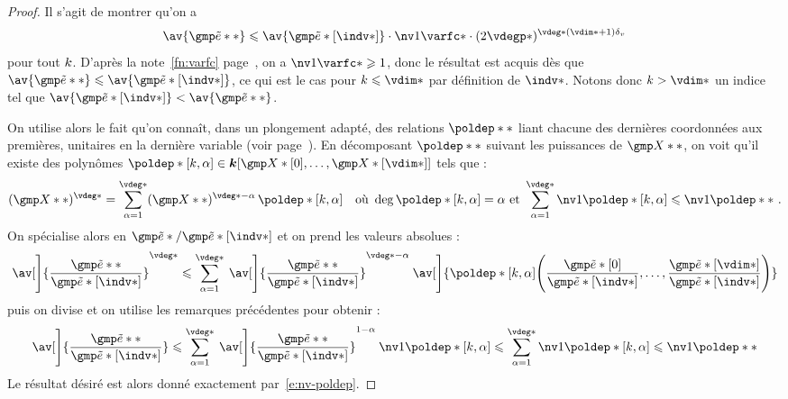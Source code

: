 \begin{proof}
  Il s'agit de montrer qu'on a
  \begin{equation}
    \av{ \cexa** }
    \le
    \av{ \cexa*[\indv*] }
    \cdot \nv1{ \varfc* }
    \cdot ( 2 \vdegp* )^{\vdeg* (\vdim* + 1) \dv}
  \end{equation}
  pour tout \( k \). D'après la note~\ref{fn:varfc}
  page~\pageref{fn:varfc}, on a \( \nv1{ \varfc* } \ge 1 \), donc le résultat
  est acquis dès que \( \av{ \cexa** } \le \av{ \cexa*[\indv*] } \), ce qui est
  le cas pour \( \ind \le \vdim* \) par définition de \( \indv* \). Notons donc
  \( \ind > \vdim* \) un indice tel que \( \av{ \cexa*[\indv*] } < \av{ \cexa**
    } \).

  On utilise alors le fait qu'on connaît, dans un plongement adapté, des
  relations \( \poldep** \) liant chacune des dernières coordonnées aux
  premières,  unitaires en la dernière variable (voir
  page~\pageref{p:def-poldep}). En décomposant \( \poldep**
  \) suivant les puissances de \( \vmp** \), on voit qu'il existe des
  polynômes \( \poldep*[\ind, \alpha] \in \cdn[ \vmp*[0], \dots, \vmp*[\vdim*]
    ] \) tels que :
  \begin{equation}
    (\vmp**) ^{ \vdeg* }
    =
    \sum_{ \alpha=1 }^{ \vdeg* }
    (\vmp**) ^{ \vdeg* - \alpha }
    \, \poldep*[\ind, \alpha]
    \quad\text{où }
    \deg \poldep*[\ind, \alpha] = \alpha
    \text{ et }
    \sum_{ \alpha=1 }^{ \vdeg* } \nv1{ \poldep*[\ind, \alpha] }
    \le \nv1{ \poldep** }
    \pmm.
  \end{equation}
  On spécialise alors en \( \cexa* / \cexa*[\indv*] \) et on prend les valeurs
  absolues :
  \begin{equation}
    \av[\Bigg]{ \frac{ \cexa** }{ \cexa*[\indv*] } }^{ \vdeg* }
    \le
    \sum_{ \alpha=1 }^{ \vdeg* }
    \: \av[\Bigg]{ \frac{ \cexa** }{ \cexa*[\indv*] } }^{ \vdeg* - \alpha }
    \: \av[\Bigg]{
      \poldep*[\ind, \alpha] \Biggl(
        \frac{ \cexa*[0] }{ \cexa*[\indv*] }, \dots,
        \frac{ \cexa*[\vdim*] }{ \cexa*[\indv*] }
      \Biggr)
    }
  \end{equation}
  puis on divise et on utilise les remarques précédentes pour obtenir :
  \begin{align}
    \av[\Bigg]{ \frac{ \cexa** }{ \cexa*[\indv*] } }
    \le
    \sum_{ \alpha=1 }^{ \vdeg* }
    \: \av[\Bigg]{ \frac{ \cexa** }{ \cexa*[\indv*] } }^{ 1 - \alpha }
    \: \nv1{ \poldep*[\ind, \alpha] }
    \le
    \sum_{ \alpha=1 }^{ \vdeg* }
    \nv1{ \poldep*[\ind, \alpha] }
    \le
    \nv1{ \poldep** }
  \end{align}
  Le résultat désiré est alors donné exactement par~\eqref{e:nv-poldep}.
\end{proof}

